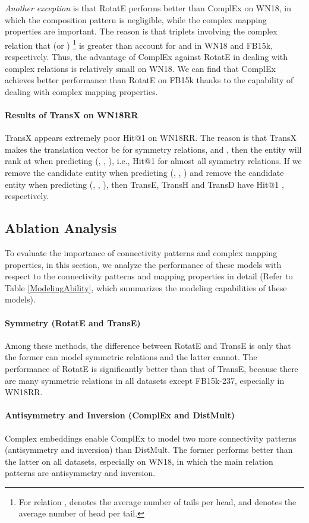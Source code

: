 \documentclass[conference]{IEEEtran}
\begin{document}
\textit{Another exception} is that RotatE performs better than ComplEx on WN18, in which the composition pattern is negligible, while the complex mapping properties are important. The reason is that triplets involving the complex relation that  (or )
\footnote{
	For relation ,  denotes the average number of tails per head, and  denotes the average number of head per tail.
} 
is greater than  account for  and  in WN18 and FB15k, respectively. Thus, the advantage of ComplEx against RotatE in dealing with complex relations is relatively small on WN18. We can find that ComplEx achieves better performance than RotatE on FB15k thanks to the capability of dealing with complex mapping properties.

\paragraph*{Results of TransX on WN18RR}
TransX appears extremely poor Hit@1 on WN18RR. The reason is that TransX makes the translation vector be  for symmetry relations, and , then the entity  will rank at  when predicting (, , ), i.e., Hit@1  for almost all symmetry relations. If we remove the candidate entity  when predicting (, , ) and remove the candidate entity  when predicting (, , ), then TransE, TransH and TransD have Hit@1 , respectively.

\subsection{Ablation Analysis}
To evaluate the importance of connectivity patterns and complex mapping properties, in this section, we analyze the performance of these models with respect to the connectivity patterns and mapping properties in detail (Refer to Table \ref{ModelingAbility}, which summarizes the modeling capabilities of these models).

\paragraph{Symmetry (RotatE and TransE)}
Among these methods, the difference between RotatE and TransE is only that the former can model symmetric relations and the latter cannot. The performance of RotatE is significantly better than that of TransE, because there are many symmetric relations in all datasets except FB15k-237, especially in WN18RR.

\paragraph{Antisymmetry and Inversion (ComplEx and DistMult)}
Complex embeddings enable ComplEx to model two more connectivity patterns (antisymmetry and inversion) than DistMult. The former performs better than the latter on all datasets, especially on WN18, in which the main relation patterns are antisymmetry and inversion.
\end{document}
